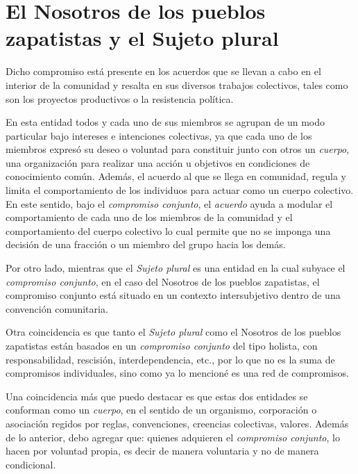 \documentclass[oneside]{book}
\begin{document}
\section{El Nosotros de los pueblos zapatistas y el Sujeto plural}
	
Dicho compromiso está presente en los acuerdos que se llevan a cabo en el interior de la comunidad y resalta en sus diversos trabajos colectivos, tales como son los proyectos productivos o la resistencia política. 

En esta entidad todos y cada uno de sus miembros se agrupan de un modo particular bajo intereses e intenciones colectivas, ya que cada uno de los miembros expresó su deseo o voluntad para constituir junto con otros un \textit{cuerpo}, una organización para realizar una acción u objetivos en condiciones de conocimiento común. Además, el acuerdo al que se llega en comunidad, regula y limita el comportamiento de los individuos para actuar como un cuerpo colectivo.
\\

En este sentido, bajo el \textit{compromiso conjunto}, el \textit{acuerdo} ayuda a modular el comportamiento de cada uno de los miembros de la comunidad y el comportamiento del cuerpo colectivo lo cual permite que no se imponga una decisión de una fracción o un miembro del grupo hacia los demás. 

Por otro lado, mientras que el \textit{Sujeto plural} es una entidad en la cual subyace el \textit{compromiso conjunto}, en el caso del Nosotros de los pueblos zapatistas, el compromiso conjunto está situado en un contexto intersubjetivo dentro de una convención comunitaria. 
	
Otra coincidencia es que tanto el \textit{Sujeto plural} como el Nosotros de los pueblos zapatistas están basados en un \textit{compromiso conjunto} del tipo holista, con responsabilidad, rescisión, interdependencia, etc., por lo que no es la suma de compromisos individuales, sino como ya lo mencioné es una red de compromisos.
	
Una coincidencia más que puedo destacar es que estas dos entidades se conforman como un \textit{cuerpo}, en el sentido de un organismo, corporación o asociación regidos por reglas, convenciones, creencias colectivas, valores. Además de lo anterior, debo agregar que: quienes adquieren el \textit{compromiso conjunto}, lo hacen por voluntad propia, es decir de manera voluntaria y no de manera condicional.
	
\end{document}
